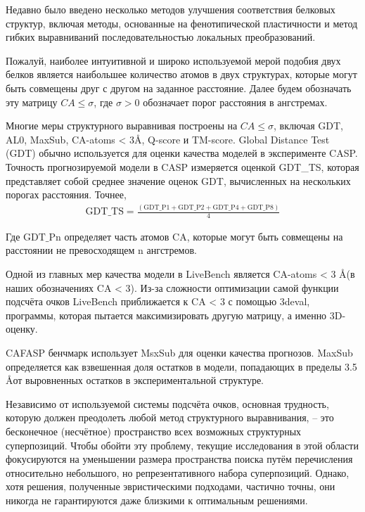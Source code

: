 \documentclass[a4paper]{extreport}
\newcommand{\angstrom}{\text\normalfont\AA}
\begin{document}
Недавно было введено несколько методов улучшения соответствия белковых структур, включая методы, основанные на фенотипической пластичности и метод гибких выравниваний последовательностью локальных преобразований.

Пожалуй, наиболее интуитивной и широко используемой мерой подобия двух белков является наибольшее количество атомов в двух структурах, которые могут быть совмещены друг с другом на заданное расстояние. Далее будем обозначать эту матрицу $CA \leq \sigma$, где $\sigma > 0$ обозначает порог расстояния в ангстремах.

Многие меры структурного выравнивая построены на $CA \leq \sigma$, включая GDT, AL0, MaxSub, CA-atoms < 3\angstrom, Q-score и TM-score. Global Distance Test (GDT) обычно используется для оценки качества моделей в эксперименте CASP. Точность прогнозируемой модели в CASP измеряется оценкой GDT\_TS, которая представляет собой среднее значение оценок GDT, вычисленных на нескольких порогах расстояния. Точнее,
\begin{gather*}
\mathrm{GDT\_TS} = \frac{(\mathrm{GDT\_P1} + \mathrm{GDT\_P2} + \mathrm{GDT\_P4} + \mathrm{GDT\_P8})}{4}
\end{gather*}

Где $\mathrm{GDT\_Pn}$ определяет часть атомов CA, которые могут быть совмещены на расстоянии не превосходящем n ангстремов.

Одной из главных мер качества модели в LiveBench является CA-atoms < 3 \angstrom (в наших обозначениях CA < 3). Из-за сложности оптимизации самой функции подсчёта очков LiveBench приближается к CA < 3 с помощью 3deval, программы, которая пытается максимизировать другую матрицу, а именно 3D-оценку.

CAFASP бенчмарк использует MsxSub для оценки качества прогнозов. MaxSub определяется как взвешенная доля остатков в модели, попадающих в пределы 3.5 \angstrom от выровненных остатков в экспериментальной структуре.

Независимо от используемой системы подсчёта очков, основная трудность, которую должен преодолеть любой метод структурного выравнивания, -- это бесконечное (несчётное) пространство всех возможных структурных суперпозиций. Чтобы обойти эту проблему, текущие исследования в этой области фокусируются на уменьшении размера пространства поиска путём перечисления относительно небольшого, но репрезентативного набора суперпозиций. Однако, хотя решения, полученные эвристическими подходами, частично точны, они никогда не гарантируются даже близкими к оптимальным решениями.
\end{document}
